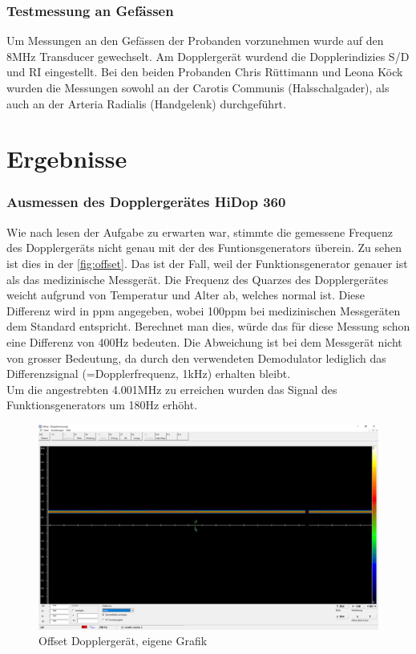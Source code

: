\documentclass[11pt]{scrartcl}
\begin{document}
    \subsubsection{Testmessung an Gefässen}
    Um Messungen an den Gefässen der Probanden vorzunehmen wurde auf den 8MHz Transducer gewechselt. 
    Am Dopplergerät wurdend die Dopplerindizies S/D und RI eingestellt.
    Bei den beiden Probanden Chris Rüttimann und Leona Köck wurden die Messungen sowohl an der Carotis Communis
    (Halsschalgader), als auch an der Arteria Radialis (Handgelenk) durchgeführt.

    \section{Ergebnisse}
    \subsubsection{Ausmessen des Dopplergerätes HiDop 360}
    Wie nach lesen der Aufgabe zu erwarten war, stimmte die gemessene Frequenz des Dopplergeräts nicht genau mit der des Funtionsgenerators überein.
    Zu sehen ist dies in der \autoref{fig:offset}.
    Das ist der Fall, weil der Funktionsgenerator genauer ist als das medizinische Messgerät.
    Die Frequenz des Quarzes des Dopplergerätes weicht aufgrund von Temperatur und Alter ab, welches normal ist.
    Diese Differenz wird in ppm angegeben, wobei 100ppm bei medizinischen Messgeräten dem Standard entspricht.
    Berechnet man dies, würde das für diese Messung schon eine Differenz von 400Hz bedeuten. 
    Die Abweichung ist bei dem Messgerät nicht von grosser Bedeutung, da durch den verwendeten Demodulator lediglich
    das Differenzsignal (=Dopplerfrequenz, 1kHz) erhalten bleibt.\\
    Um die angestrebten 4.001MHz zu erreichen wurden das Signal des Funktionsgenerators um 180Hz erhöht.

    \begin{figure}[H]
        \includegraphics[width=16cm]{images/4001MHz.png}
        \caption{Offset Dopplergerät, eigene Grafik}
        \label{fig:offset}
    \end{figure}
\end{document}

